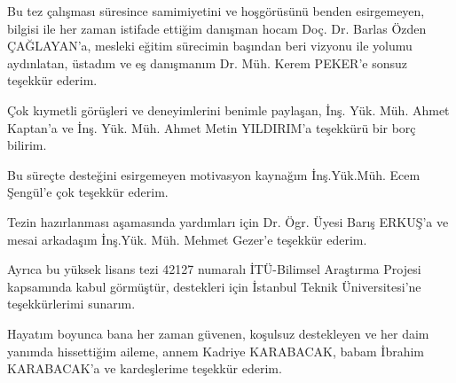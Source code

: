 Bu tez çalışması süresince samimiyetini ve hoşgörüsünü benden esirgemeyen, bilgisi ile her zaman istifade ettiğim danışman hocam Doç. Dr. Barlas Özden ÇAĞLAYAN’a, mesleki eğitim sürecimin başından beri vizyonu ile yolumu aydınlatan, üstadım ve eş danışmanım Dr. Müh. Kerem PEKER’e sonsuz teşekkür ederim.

Çok kıymetli görüşleri ve deneyimlerini benimle paylaşan, İnş. Yük. Müh. Ahmet Kaptan’a ve İnş. Yük. Müh. Ahmet Metin YILDIRIM’a teşekkürü bir borç bilirim.

Bu süreçte desteğini esirgemeyen motivasyon kaynağım İnş.Yük.Müh. Ecem Şengül’e çok teşekkür ederim. 

Tezin hazırlanması aşamasında yardımları için Dr. Ögr. Üyesi Barış ERKUŞ’a ve mesai arkadaşım İnş.Yük. Müh. Mehmet Gezer’e teşekkür ederim.

Ayrıca bu yüksek lisans tezi 42127 numaralı İTÜ-Bilimsel Araştırma Projesi kapsamında kabul görmüştür, destekleri için İstanbul Teknik Üniversitesi’ne teşekkürlerimi sunarım.

Hayatım boyunca bana her zaman güvenen, koşulsuz destekleyen ve her daim yanımda hissettiğim aileme, annem Kadriye KARABACAK, babam İbrahim KARABACAK’a ve kardeşlerime teşekkür ederim.